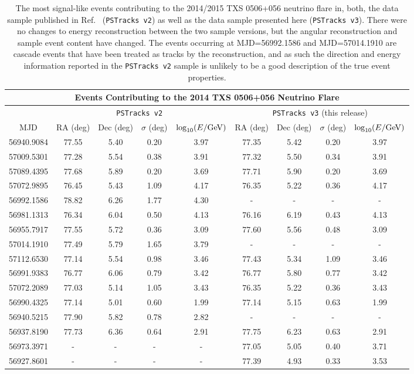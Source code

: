 \documentclass[aps,10pt,prd,twocolumn,floats,letterpaper,showpacs,nofootinbib,bibnotes,notitlepage,superscriptaddress,floatfix]{revtex4-1}
\newcommand{\MA}[1]{{\color{black}#1}}
\begin{document}
\begin{table}[p]
\centering
\begin{ruledtabular}
\begin{tabular}{c|cccc|cccc}
\multicolumn{9}{c}{Events Contributing to the 2014 TXS 0506+056 Neutrino Flare} \\[0.1cm]
\hline
\multicolumn{1}{c|}{} &
\multicolumn{4}{c|}{\MA{\tt PSTracks v2}~\cite{IceCube:2018cha,IceCube:2019}} & 
\multicolumn{4}{c}{\MA{\tt PSTracks v3} (this release)}\\[0.1cm]
MJD & RA (deg) & Dec (deg) & $\sigma$ (deg) & $\log_{10}(E/{\rm GeV})$ & RA (deg) & Dec (deg) & $\sigma$ (deg) & $\log_{10}(E/{\rm GeV})$\\ 
\hline
56940.9084 & 77.55 & 5.40 & 0.20 & 3.97 & 77.35 & 5.42 & 0.20 & 3.97\\
57009.5301 & 77.28 & 5.54 & 0.38 & 3.91 & 77.32 & 5.50 & 0.34 & 3.91\\
57089.4395 & 77.68 & 5.89 & 0.20 & 3.69 & 77.71 & 5.90 & 0.20 & 3.69\\
57072.9895 & 76.45 & 5.43 & 1.09 & 4.17 & 76.35 & 5.22 & 0.36 & 4.17\\
56992.1586 & 78.82 & 6.26 & 1.77 & 4.30 & - & - & - & - \\
56981.1313& 76.34 & 6.04 & 0.50 & 4.13 & 76.16 & 6.19 & 0.43 & 4.13 \\
56955.7917 & 77.55 & 5.72 & 0.36 & 3.09 & 77.60 & 5.56 & 0.48 & 3.09 \\
57014.1910 & 77.49 & 5.79 & 1.65 & 3.79 & - & - & - & -  \\
57112.6530 & 77.14 & 5.54 & 0.98 & 3.46 & 77.43 & 5.34 & 1.09 & 3.46 \\
56991.9383 & 76.77 & 6.06 & 0.79 & 3.42 & 76.77 & 5.80 & 0.77 & 3.42 \\
57072.2089 & 77.03 & 5.14 & 1.05 & 3.43 & 76.35 & 5.22 & 0.36 & 3.43 \\
56990.4325 & 77.14 & 5.01 & 0.60 & 1.99 & 77.14 & 5.15 & 0.63 & 1.99 \\
56940.5215 & 77.90 & 5.82 & 0.78 & 2.82 & - & - & - & - \\
56937.8190 & 77.73 & 6.36 & 0.64 & 2.91 & 77.75 & 6.23 & 0.63 & 2.91 \\
56973.3971 & - & - & - & - & 77.05 & 5.05 & 0.40 & 3.71 \\
56927.8601 & - & - & - & - & 77.39 & 4.93 & 0.33 & 3.53 \\
\end{tabular}
\end{ruledtabular}
\caption[]{The most signal-like events contributing to the 2014/2015 TXS 0506+056 neutrino flare in, both, the data sample published in Ref.~\cite{IceCube:2019} ({\tt PSTracks v2}) as well as the data sample presented here ({\tt PSTracks v3}). There were no changes to energy reconstruction between the two sample versions, but the angular reconstruction and sample event content have changed. The events occurring at MJD=56992.1586 and MJD=57014.1910 are cascade events that have been treated as tracks by the reconstruction, and as such the direction and energy information reported in the {\tt PSTracks v2} sample is unlikely to be a good description of the true event properties.}\label{tab:TXSFlareEvtsTable}
\end{table}
\end{document}
